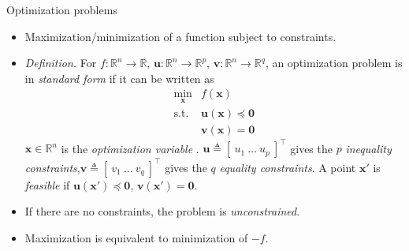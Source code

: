 \documentclass{beamer}
\numberwithin{equation}{section}
\begin{document}
\begin{frame}{Optimization problems}
    \begin{itemize}
        \item
        Maximization/minimization of a function subject to constraints.

        \item
        \textit{Definition.} For $ f: \mathbb{R}^n \rightarrow \mathbb{R} $,
        $ \mathbf{u} : \mathbb{R}^n \rightarrow \mathbb{R}^p $,
        $ \mathbf{v} : \mathbb{R}^n \rightarrow \mathbb{R}^q $, an
        optimization problem is in \textit{standard form} if it can be written
        as
        \begin{equation*}
            \begin{array}{ll}
                \displaystyle\min_\mathbf{x} & f(\mathbf{x}) \\
                \text{s.t.} & \mathbf{u}(\mathbf{x}) \preceq \mathbf{0} \\
                & \mathbf{v}(\mathbf{x}) = \mathbf{0}
            \end{array}
        \end{equation*}
        $ \mathbf{x} \in \mathbb{R}^n $ is the \textit{optimization
        variable} \cite{bv_convex_opt}. $ \mathbf{u} \triangleq
        [ \ u_1 \ \ldots \ u_p \ ]^\top $ gives the $ p $ \textit{inequality
        constraints},$ \mathbf{v} \triangleq [ \ v_1 \ \ldots \ v_q \ ]^\top $
        gives the $ q $ \textit{equality constraints}. A point $ \mathbf{x}' $
        is \textit{feasible} if $ \mathbf{u}(\mathbf{x}') \preceq
        \mathbf{0} $, $ \mathbf{v}(\mathbf{x}') = \mathbf{0} $.

        \item
        If there are no constraints, the problem is \textit{unconstrained}.

        \item
        Maximization is equivalent to minimization of $ -f $.
    \end{itemize}
\end{frame}
\end{document}
